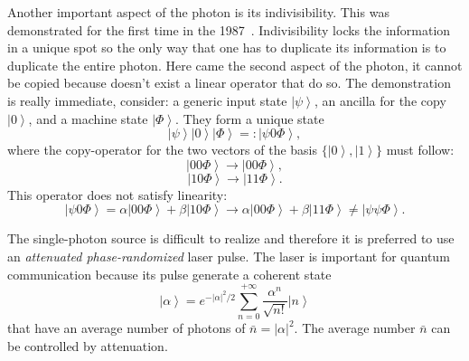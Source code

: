 Another important aspect of the photon is its indivisibility. This was demonstrated for the first time in the 1987~\cite{a23}. Indivisibility locks the information in a unique spot so the only way that one has to duplicate its information is to duplicate the entire photon. Here came the second aspect of the photon, it cannot be copied because doesn't exist a linear operator that do so. The demonstration is really immediate, consider: a generic input state $\left|\psi\right>$, an ancilla for the copy $\left|0\right>$, and a machine state $\left|\Phi\right>$. They form a unique state
\begin{equation}
  \left|\psi\right>\left|0\right>\left|\Phi\right> =: \left|\psi 0 \Phi\right>,
\end{equation}
where the copy-operator for the two vectors of the basis $\{\left|0\right>, \left|1\right>\}$ must follow:
\begin{equation}
  \left|0 0 \Phi\right> \to \left|0 0 \Phi\right>,
\end{equation}
\begin{equation}
  \left|1 0 \Phi\right> \to \left|1 1 \Phi\right>.
\end{equation}
This operator does not satisfy linearity:
\begin{equation}
  \left|\psi 0 \Phi\right> = \alpha\left|0 0 \Phi\right> + \beta\left|1 0 \Phi\right> \to \alpha\left|0 0 \Phi\right> + \beta\left|1 1 \Phi\right> \ne \left|\psi \psi \Phi\right>.
\end{equation}

The single-photon source is difficult to realize and therefore it is preferred to use an \textit{attenuated phase-randomized} laser pulse. The laser is important for quantum communication because its pulse generate a coherent state
\begin{equation}
  \left|\alpha\right> = e^{- |\alpha|^2 / 2} \sum_{n=0}^{+\infty} \frac{\alpha^n}{\sqrt{n!}} \left|n\right>
\end{equation}
that have an average number of photons of $\bar{n} = |\alpha|^2$. The average number $\bar{n}$ can be controlled by attenuation.


